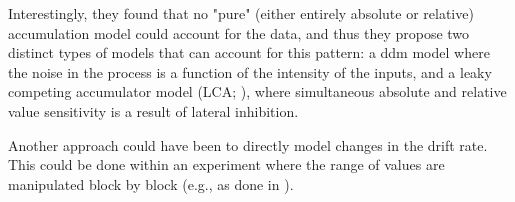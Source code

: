\documentclass[11pt,a4paper]{article}
\begin{document}
Interestingly, they found that no "pure" (either entirely absolute or relative) accumulation model could account for the data, and thus they propose two distinct types  of models that can account for this pattern: a ddm model where the noise in the process is a function of the intensity of the inputs, and a leaky competing accumulator model (LCA; ), where simultaneous absolute and relative value sensitivity is a result of lateral inhibition. 

Another approach could have been to directly model changes in the drift rate. This could be done within an experiment where the range of values are manipulated block by block (e.g., as done in ). 



\newpage


\end{document}
